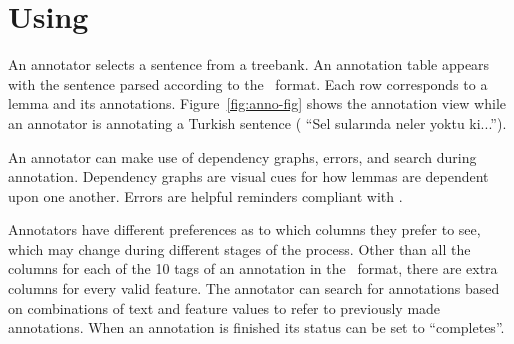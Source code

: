 \section{Using \boatvtwo}
\label{sec:annotation}


An annotator selects a sentence from a treebank.
An annotation table appears with the sentence parsed according to the \ud\ format.
Each row corresponds to a lemma and its annotations. 
Figure~\ref{fig:anno-fig} shows the annotation view while an annotator is annotating a Turkish sentence ( ``Sel sularında neler yoktu ki...''). 

An annotator can make use of dependency graphs, errors, and search during annotation.
Dependency graphs are visual cues for how lemmas are dependent upon one another.
Errors are helpful reminders compliant with \ud.

Annotators have different preferences as to which columns they prefer to see, which may change during different stages of the process.
Other than all the columns for each of the 10 tags of an annotation in the \conllu\ format, there are extra columns for every valid feature. 
The annotator can search for annotations based on combinations of text and feature values to refer to previously made annotations.
When an annotation is finished its status can be set to ``completes''.


